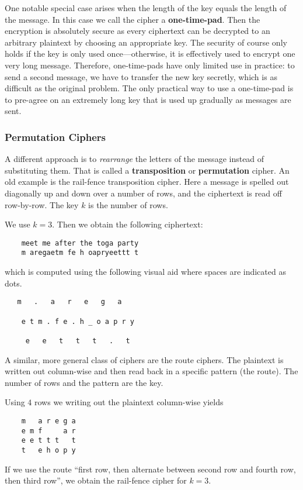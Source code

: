 One notable special case arises when the length of the key equals the length of the message.
In this case we call the cipher a \textbf{one-time-pad}.
Then the encryption is absolutely secure as every ciphertext can be decrypted to an arbitrary plaintext by choosing an appropriate key.
The security of course only holds if the key is only used once---otherwise, it is effectively used to encrypt one very long message.
Therefore, one-time-pads have only limited use in practice: to send a second message, we have to transfer the new key secretly, which is as difficult as the original problem.
The only practical way to use a one-time-pad is to pre-agree on an extremely long key that is used up gradually as messages are sent.

\subsubsection{Permutation Ciphers}

A different approach is to \emph{rearrange} the letters of the message instead of substituting them.
That is called a \textbf{transposition} or \textbf{permutation} cipher.
An old example is the rail-fence transposition cipher.
Here a message is spelled out diagonally up and down over a number of rows, and the ciphertext is read off row-by-row.
The key $k$ is the number of rows.

\begin{example}
 We use $k=3$.
 Then we obtain the following ciphertext:
  \begin{lstlisting}
    meet me after the toga party
    m aregaetm fe h oapryeettt t
  \end{lstlisting}
which is computed using the following visual aid where spaces are indicated as dots.
  \begin{lstlisting}
   m   .   a   r   e   g   a

    e t m . f e . h _ o a p r y

     e   e   t   t   t   .   t
  \end{lstlisting}
\end{example}

A similar, more general class of ciphers are the route ciphers.
The plaintext is written out column-wise and then read back in a specific pattern (the route).
The number of rows and the pattern are the key.

\begin{example}
Using $4$ rows we writing out the plaintext column-wise yields
  \begin{lstlisting}
    m   a r e g a
    e m f     a r
    e e t t t   t
    t   e h o p y
  \end{lstlisting}

If we use the route ``first row, then alternate between second row and fourth row, then third row'', we obtain the rail-fence cipher for $k=3$.
\end{example}

